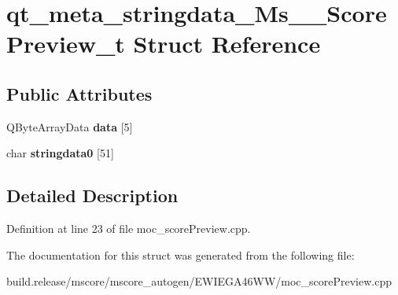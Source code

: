 \hypertarget{structqt__meta__stringdata___ms_____score_preview__t}{}\section{qt\+\_\+meta\+\_\+stringdata\+\_\+\+Ms\+\_\+\+\_\+\+Score\+Preview\+\_\+t Struct Reference}
\label{structqt__meta__stringdata___ms_____score_preview__t}
\subsection*{Public Attributes}
\begin{DoxyCompactItemize}
\item 
\mbox{\label{structqt__meta__stringdata___ms_____score_preview__t_aa552189b474528d53495f98497a30db7}} 
Q\+Byte\+Array\+Data {\bfseries data} \mbox{[}5\mbox{]}
\item 
\mbox{\label{structqt__meta__stringdata___ms_____score_preview__t_a4884f2761eaf2fcad03948f39701d2e2}} 
char {\bfseries stringdata0} \mbox{[}51\mbox{]}
\end{DoxyCompactItemize}


\subsection{Detailed Description}


Definition at line 23 of file moc\+\_\+score\+Preview.\+cpp.



The documentation for this struct was generated from the following file\+:\begin{DoxyCompactItemize}
\item 
build.\+release/mscore/mscore\+\_\+autogen/\+E\+W\+I\+E\+G\+A46\+W\+W/moc\+\_\+score\+Preview.\+cpp\end{DoxyCompactItemize}
